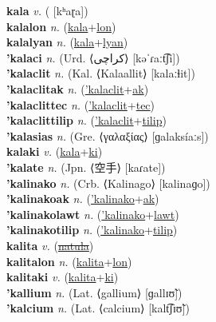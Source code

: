 \textbf{kala} \textit{v.} ( [kʰaɽa])
 \label{kala} \\
\textbf{kalalon} \textit{n.} (\hyperref[kala]{kala}+\hyperref[lon]{lon})
 \label{kalalon} \\
\textbf{kalalyan} \textit{n.} (\hyperref[kala]{kala}+\hyperref[lyan]{lyan})
 \label{kalalyan} \\
\textbf{'kalaci} \textit{n.} (Urd. ⟨کراچی‎⟩ [kəˈɾaːt͡ʃi])
 \label{'kalaci} \\
\textbf{'kalaclit} \textit{n.} (Kal. ⟨Kalaallit⟩ [kalaːɬit])
 \label{'kalaclit} \\
\textbf{'kalaclitak} \textit{n.} (\hyperref['kalaclit]{'kalaclit}+\hyperref[ak]{ak})
 \label{'kalaclitak} \\
\textbf{'kalaclittec} \textit{n.} (\hyperref['kalaclit]{'kalaclit}+\hyperref[tec]{tec})
 \label{'kalaclittec} \\
\textbf{'kalaclittilip} \textit{n.} (\hyperref['kalaclit]{'kalaclit}+\hyperref[tilip]{tilip})
 \label{'kalaclittilip} \\
\textbf{'kalasias} \textit{n.} (Gre. ⟨γαλαξίας⟩ [ɡalaksíaːs])
 \label{'kalasias} \\
\textbf{kalaki} \textit{v.} (\hyperref[kala]{kala}+\hyperref[ki]{ki})
 \label{kalaki} \\
\textbf{'kalate} \textit{n.} (Jpn. ⟨空手⟩ [kaɾate])
 \label{'kalate} \\
\textbf{'kalinako} \textit{n.} (Crb. ⟨Kalinago⟩ [kalinaɡo])
 \label{'kalinako} \\
\textbf{'kalinakoak} \textit{n.} (\hyperref['kalinako]{'kalinako}+\hyperref[ak]{ak})
 \label{'kalinakoak} \\
\textbf{'kalinakolawt} \textit{n.} (\hyperref['kalinako]{'kalinako}+\hyperref[lawt]{lawt})
 \label{'kalinakolawt} \\
\textbf{'kalinakotilip} \textit{n.} (\hyperref['kalinako]{'kalinako}+\hyperref[tilip]{tilip})
 \label{'kalinakotilip} \\
\textbf{kalita} \textit{v.} (\hyperref[natula]{\sout{natula}})
 \label{kalita} \\
\textbf{kalitalon} \textit{n.} (\hyperref[kalita]{kalita}+\hyperref[lon]{lon})
 \label{kalitalon} \\
\textbf{kalitaki} \textit{v.} (\hyperref[kalita]{kalita}+\hyperref[ki]{ki})
 \label{kalitaki} \\
\textbf{'kallium} \textit{n.} (Lat. ⟨gallium⟩ [ɡallɪʊ̃])
 \label{'kallium} \\
\textbf{'kalcium} \textit{n.} (Lat. ⟨calcium⟩ [kalt͡ʃɪʊ̃])
